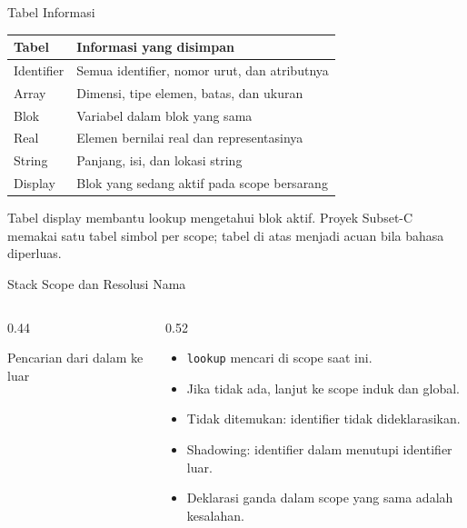 \documentclass[aspectratio=169,10pt,t]{beamer}
\begin{document}
\begin{frame}{Tabel Informasi}
  \scriptsize
  \setlength{\tabcolsep}{4pt}
  \begin{tabular}{@{}p{3.0cm}p{9.6cm}@{}}
    \toprule
    \textbf{Tabel} & \textbf{Informasi yang disimpan} \\
    \midrule
    Identifier & Semua identifier, nomor urut, dan atributnya \\
    Array & Dimensi, tipe elemen, batas, dan ukuran \\
    Blok & Variabel dalam blok yang sama \\
    Real & Elemen bernilai real dan representasinya \\
    String & Panjang, isi, dan lokasi string \\
    Display & Blok yang sedang aktif pada scope bersarang \\
    \bottomrule
  \end{tabular}

  \vspace{4pt}
  {\footnotesize\color{ubbblue!80}Tabel display membantu lookup
  mengetahui blok aktif. Proyek Subset-C memakai satu tabel simbol per
  scope; tabel di atas menjadi acuan bila bahasa diperluas.}
\end{frame}

\begin{frame}{Stack Scope dan Resolusi Nama}
  \begin{columns}[T,onlytextwidth]
    \begin{column}{0.44\textwidth}
      \centering
      \par {\scriptsize Pencarian dari dalam ke luar}
    \end{column}
    \begin{column}{0.52\textwidth}
      \begin{itemize}
        \item \texttt{lookup} mencari di scope saat ini.
        \item Jika tidak ada, lanjut ke scope induk dan global.
        \item Tidak ditemukan: identifier tidak dideklarasikan.
        \item Shadowing: identifier dalam menutupi identifier luar.
        \item Deklarasi ganda dalam scope yang sama adalah kesalahan.
      \end{itemize}
    \end{column}
  \end{columns}
\end{frame}
\end{document}
